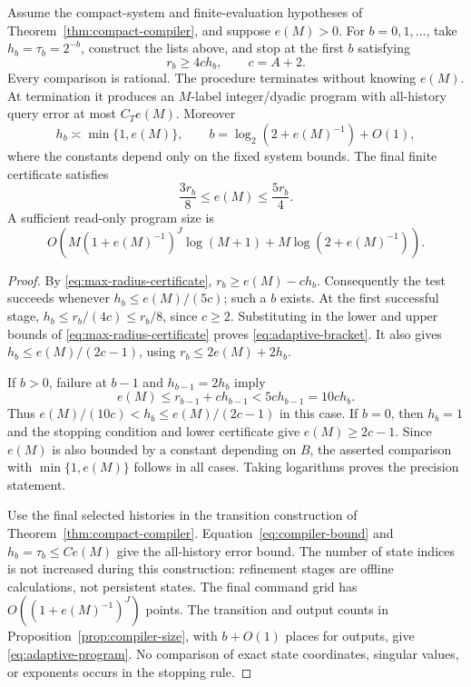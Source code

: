 \begin{theorem}
\label{thm:adaptive-compiler}
Assume the compact-system and finite-evaluation hypotheses of
Theorem~\ref{thm:compact-compiler}, and suppose $e(M)>0$.
For $b=0,1,\ldots$, take $h_b=\tau_b=2^{-b}$, construct the lists
above, and stop at the first $b$ satisfying
\begin{equation}\label{eq:adaptive-stop}
 r_b\ge4c h_b,\qquad c=A+2.
\end{equation}
Every comparison is rational. The procedure terminates without knowing
$e(M)$. At termination it produces an $M$-label integer/dyadic program
with all-history query error at most $C_T e(M)$. Moreover
\begin{equation}\label{eq:adaptive-scale}
 h_b\asymp\min\{1,e(M)\},\qquad
 b=\log_2(2+e(M)^{-1})+O(1),
\end{equation}
where the constants depend only on the fixed system bounds. The final
finite certificate satisfies
\begin{equation}\label{eq:adaptive-bracket}
 \frac{3r_b}{8}\le e(M)\le\frac{5r_b}{4}.
\end{equation}
A sufficient read-only program size is
\begin{equation}\label{eq:adaptive-program}
 O\!\left(M(1+e(M)^{-1})^J\log(M+1)
                +M\log(2+e(M)^{-1})\right).
\end{equation}
\end{theorem}
\begin{proof}
By \eqref{eq:max-radius-certificate}, $r_b\ge e(M)-ch_b$.
Consequently the test succeeds whenever $h_b\le e(M)/(5c)$;
such a $b$ exists. At the first successful stage,
$h_b\le r_b/(4c)\le r_b/8$, since $c\ge2$.
Substituting in the lower and upper bounds of
\eqref{eq:max-radius-certificate} proves \eqref{eq:adaptive-bracket}.
It also gives $h_b\le e(M)/(2c-1)$, using
$r_b\le2e(M)+2h_b$.

If $b>0$, failure at $b-1$ and $h_{b-1}=2h_b$ imply
\[
 e(M)\le r_{b-1}+ch_{b-1}<5ch_{b-1}=10ch_b.
\]
Thus $e(M)/(10c)<h_b\le e(M)/(2c-1)$ in this case. If $b=0$,
then $h_b=1$ and the stopping condition and lower certificate give
$e(M)\ge2c-1$. Since $e(M)$ is also bounded by a constant depending
on $B$, the asserted comparison with $\min\{1,e(M)\}$ follows in
all cases. Taking logarithms proves the precision statement.

Use the final selected histories in the transition construction of
Theorem~\ref{thm:compact-compiler}. Equation~\eqref{eq:compiler-bound}
and $h_b=\tau_b\le C e(M)$ give the all-history error bound. The
number of state indices is not increased during this construction:
refinement stages are offline calculations, not persistent states.
The final command grid has $O((1+e(M)^{-1})^J)$ points. The transition
and output counts in Proposition~\ref{prop:compiler-size}, with
$b+O(1)$ places for outputs, give \eqref{eq:adaptive-program}.
No comparison of exact state coordinates, singular values, or exponents
occurs in the stopping rule.
\end{proof}

